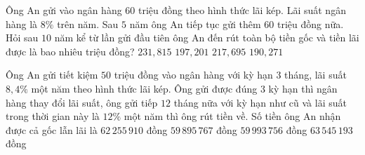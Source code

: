 \begin{ex}%
	Ông An gửi vào ngân hàng $60$ triệu đồng theo hình thức lãi kép. Lãi suất ngân hàng là $8\%$ trên năm. Sau $5$ năm ông  An tiếp tục gửi thêm $60$ triệu đồng nữa. Hỏi sau $10$ năm kể từ lần gửi đầu tiên ông An đến rút toàn bộ tiền gốc và tiền lãi được là bao nhiêu triệu đồng?
	 \choice
		 {$231{,}815$}
		{$197{,}201$} 
		{\True $217{,}695$} 
		{$190{,}271$} 
\end{ex}

\begin{ex}%
	Ông An gửi tiết kiệm $50$ triệu đồng vào ngân hàng với kỳ hạn $3$ tháng, lãi suất $8{,}4\%$ một năm theo  hình thức lãi kép. Ông gửi được đúng $3$ kỳ hạn thì ngân hàng thay đổi lãi suất, ông gửi tiếp $12$ tháng nữa với kỳ hạn như cũ và lãi suất trong thời gian này là $12\%$ một năm thì ông rút tiền về. Số tiền ông An nhận được cả gốc lẫn lãi là
	\choice 
		{$62\,255\,910$  đồng}
		{\True $59\,895\,767$ đồng} 
		 {$59\,993\,756$ đồng}
		 {$63\,545\,193$ đồng}
\end{ex}

